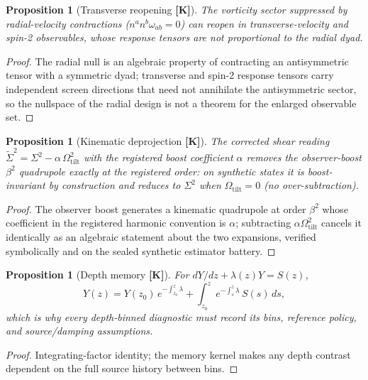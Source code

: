 \documentclass[10pt]{article}
\newtheorem{proposition}[theorem]{Proposition}
\theoremstyle{definition}
\newcommand{\tier}[1]{\textbf{[#1]}}
\newcommand{\OmT}{\Omega_{\mathrm{tilt}}}
\begin{document}
\begin{proposition}[Transverse reopening \tier{K}]
\label{prop:reopen}
The vorticity sector suppressed by radial-velocity contractions
($n^a n^b \omega_{ab} = 0$) can reopen in transverse-velocity and
spin-2 observables, whose response tensors are not proportional to
the radial dyad.
\end{proposition}
\begin{proof}
The radial null is an algebraic property of contracting an
antisymmetric tensor with a symmetric dyad; transverse and spin-2
response tensors carry independent screen directions that need not
annihilate the antisymmetric sector, so the nullspace of the radial
design is not a theorem for the enlarged observable set.
\end{proof}

\begin{proposition}[Kinematic deprojection \tier{K}]
\label{prop:deproj}
The corrected shear reading
$\widetilde\Sigma^2 = \Sigma^2 - \alpha\,\OmT^2$ with the registered
boost coefficient $\alpha$ removes the observer-boost $\beta^2$
quadrupole exactly at the registered order: on synthetic states it is
boost-invariant by construction and reduces to $\Sigma^2$ when
$\OmT = 0$ (no over-subtraction).
\end{proposition}
\begin{proof}
The observer boost generates a kinematic quadrupole at order
$\beta^2$ whose coefficient in the registered harmonic convention is
$\alpha$; subtracting $\alpha\OmT^2$ cancels it identically as an
algebraic statement about the two expansions, verified symbolically
and on the sealed synthetic estimator battery.
\end{proof}

\begin{proposition}[Depth memory \tier{K}]
\label{prop:volterra}
For $dY/dz + \lambda(z) Y = S(z)$,
\begin{equation}
Y(z) = Y(z_0)\,e^{-\int_{z_0}^{z}\lambda}
 + \int_{z_0}^{z} e^{-\int_{s}^{z}\lambda}\, S(s)\, ds,
\end{equation}
which is why every depth-binned diagnostic must record its bins,
reference policy, and source/damping assumptions.
\end{proposition}
\begin{proof}
Integrating-factor identity; the memory kernel makes any depth
contrast dependent on the full source history between bins.
\end{proof}
\end{document}
